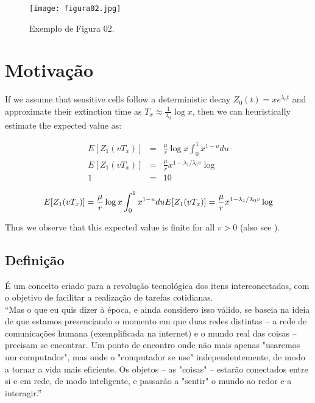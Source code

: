 \documentclass{classe_cn}                 %
\begin{document}
\begin{figure}[h!]
  \begin{center}
    \texttt{[image: figura02.jpg]}
    \caption{Exemplo de Figura 02.} 
    \label{tag_figura_02}
  \end{center}
\end{figure}

\section{Motivação}

If we assume that sensitive cells follow a deterministic decay $Z_0(t) = xe^{\lambda_0 t}$ and approximate their extinction time as $T_x \approx \frac{1}{\lambda_0} \log x$, then we can heuristically estimate the expected value as:

\begin{eqnarray}
\label{eqexpmuts}
  E [Z_1(vT_x)] &=& \frac{\mu}{r}\log x \int_0^{1} x^{1-u} du \\
  E [Z_1(vT_x)] &=& \frac{\mu}{r}x^{1-{\lambda_1}/{\lambda_0}v}\log  \\
  1 &=& 10
\end{eqnarray}

\begin{equation}
  E [Z_1(vT_x)] = \frac{\mu}{r}\log x \int_0^{1} x^{1-u} du \\
  E [Z_1(vT_x)] = \frac{\mu}{r}x^{1-{\lambda_1}/{\lambda_0}v}\log 
\end{equation}

Thus we observe that this expected value is finite for all $v>0$ (also see \cite{Rosenfeld:1970}).

\subsection{Definição} %
É um conceito criado para a revolução tecnológica dos itens interconectados, 
com o objetivo de facilitar a realização de tarefas cotidianas.\\

“Mas o que eu quis dizer à época, e ainda considero isso válido, se baseia 
na ideia de que estamos presenciando o momento em que duas redes distintas – 
a rede de comunicações humana (exemplificada na internet) e o mundo real das coisas – 
precisam se encontrar. Um ponto de encontro onde não mais apenas "usaremos um 
computador", mas onde o "computador se use" independentemente, de modo a tornar a
vida mais eficiente. Os objetos – as "coisas" – estarão conectados entre si e em rede, 
de modo inteligente, e passarão a "sentir" o mundo ao redor e a interagir.”\\  
\end{document}
